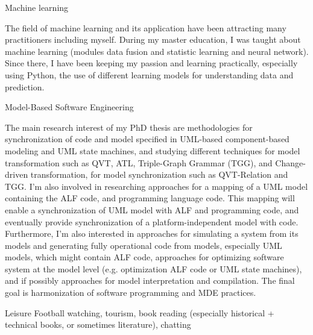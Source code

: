 \begin{cventries}
\cvinterest
{Machine learning}
{\begin{cvitems}
		\item{The field of machine learning and its application have been attracting many practitioners including myself.
During my master education, I was taught about machine learning (modules data fusion and statistic learning and neural network). 
Since there, I have been keeping my passion and learning practically, especially using Python, the use of different learning models for understanding data and prediction.}
\end{cvitems}
}

\cvinterest
{Model-Based Software Engineering}
{
	\begin{cvitems}
	\item{The main research interest of my PhD thesis are methodologies for synchronization of code and model specified in UML-based component-based modeling and UML state machines, and studying different techniques for model transformation such as QVT, ATL, Triple-Graph Grammar (TGG), and Change-driven transformation, for model synchronization such as QVT-Relation and TGG.	
I'm also involved in researching approaches for a mapping of a UML model containing the ALF code, and programming language code.
This mapping will enable a synchronization of UML model with ALF and programming code, and eventually provide synchronization of a platform-independent model with code.
Furthermore, I'm also interested in approaches for simulating a system from its models and generating fully operational code from models, especially UML models, which might contain ALF code, approaches for optimizing software system at the model level (e.g. optimization ALF code or UML state machines), and if possibly approaches for model interpretation and compilation.
The final goal is harmonization of software programming and MDE practices.}
\end{cvitems}}


\cvinterest
{Leisure}
{Football watching, tourism, book reading (especially historical + technical books, or sometimes literature), chatting}

\begin{comment}
\cvinterest
{Model-Driven Engineering with Large Models}
{
	\begin{cvitems}
		\item {I have been working with Papyrus UML models during my thesis for generating real case-study embedded systems, e.g. 12000 lines of code generated for the Lego Car factory case study. When models become large, the processing of the models, e.g. querying and loading for model transformations, becomes very slow, which might harms the adoption of modeling techniques to industrial development. For this, I'm very interested in studying techniques for speeding model manipulations up such as incremental model query with IncQuery or the PrefetchML prefetching and caching language for caching models.}
	\end{cvitems}
}
\end{comment}


\end{cventries}

